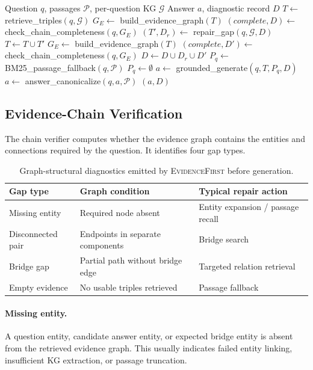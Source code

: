 \documentclass[runningheads]{llncs}
\newcommand{\sys}{\textsc{EvidenceFirst}\xspace}
\newcommand{\calG}{\mathcal{G}}
\newcommand{\calP}{\mathcal{P}}
\begin{document}
\begin{algorithm}[t]
\caption{\sys inference}
\label{alg:evidencefirst}
\begin{algorithmic}[1]
\Require Question $q$, passages $\calP$, per-question KG $\calG$
\Ensure Answer $a$, diagnostic record $D$
\State $T \gets$ retrieve\_triples$(q,\calG)$
\State $G_E \gets$ build\_evidence\_graph$(T)$
\State $(complete, D) \gets$ check\_chain\_completeness$(q,G_E)$
    \State $(T', D_r) \gets$ repair\_gap$(q,\calG,D)$
    \State $T \gets T \cup T'$
    \State $G_E \gets$ build\_evidence\_graph$(T)$
    \State $(complete, D') \gets$ check\_chain\_completeness$(q,G_E)$
    \State $D \gets D \cup D_r \cup D'$
\EndIf
{}
    \State $P_q \gets$ BM25\_passage\_fallback$(q,\calP)$
\Else
    \State $P_q \gets \emptyset$
\EndIf
\State $a \gets$ grounded\_generate$(q,T,P_q,D)$
\State $a \gets$ answer\_canonicalize$(q,a,\calP)$
\State \Return $(a,D)$
\end{algorithmic}
\end{algorithm}

\subsection{Evidence-Chain Verification}
\label{sec:verification}

The chain verifier computes whether the evidence graph contains the entities
and connections required by the question. It identifies four gap types.

\begin{table}[t]
\centering
\caption{Graph-structural diagnostics emitted by \sys before generation.}
\label{tab:gap_types}
\begin{tabular}{lll}
\toprule
Gap type & Graph condition & Typical repair action \\
\midrule
Missing entity & Required node absent & Entity expansion / passage recall \\
Disconnected pair & Endpoints in separate components & Bridge search \\
Bridge gap & Partial path without bridge edge & Targeted relation retrieval \\
Empty evidence & No usable triples retrieved & Passage fallback \\
\bottomrule
\end{tabular}
\end{table}

\paragraph{Missing entity.}
A question entity, candidate answer entity, or expected bridge entity is absent
from the retrieved evidence graph. This usually indicates failed entity linking,
insufficient KG extraction, or passage truncation.
\end{document}
